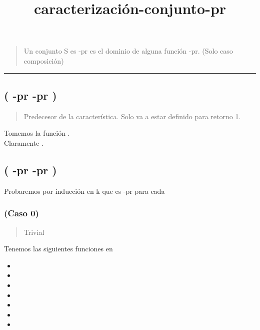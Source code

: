 \documentclass[
]{article}
\title{caracterización-conjunto-pr}
\author{}
\date{}
\providecommand{\tightlist}{%
  \setlength{\itemsep}{0pt}\setlength{\parskip}{0pt}}
\begin{document}
\maketitle

\begin{quote}
Un conjunto S es {}-pr {} es el dominio de alguna función {}-pr. (Solo
caso composición)
\end{quote}

\begin{center}\rule{0.5\linewidth}{0.5pt}\end{center}

\hypertarget{pr--pr}{%
\subsection{\texorpdfstring{( {}-pr {}-pr
)}{( -pr -pr )}}\label{pr--pr}}

\begin{quote}
Predecesor de la característica. Solo va a estar definido para retorno
1.
\end{quote}

Tomemos la función {}.\\
Claramente {}.

\hypertarget{pr--pr-1}{%
\subsection{\texorpdfstring{( {}-pr {}-pr
)}{( -pr -pr )}}\label{pr--pr-1}}

Probaremos por inducción en k que {} es {}-pr para cada {}

\hypertarget{caso-0}{%
\subsubsection{(Caso 0)}\label{caso-0}}

\begin{quote}
Trivial
\end{quote}

Tenemos las siguientes funciones en {}

\begin{itemize}
\tightlist
\item
  {}
\item
  {}
\item
  {}
\item
  {}
\item
  {}
\item
  {}
\item
  {}
\end{itemize}
\end{document}
